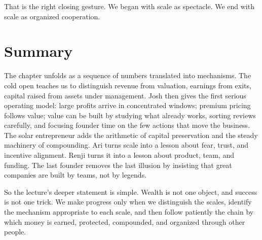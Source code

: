 That is the right closing gesture. We began with scale as spectacle. We end with scale as organized cooperation.

\section{Summary}

The chapter unfolds as a sequence of numbers translated into mechanisms. The cold open teaches us to distinguish revenue from valuation, earnings from exits, capital raised from assets under management. Josh then gives the first serious operating model: large profits arrive in concentrated windows; premium pricing follows value; value can be built by studying what already works, sorting reviews carefully, and focusing founder time on the few actions that move the business. The solar entrepreneur adds the arithmetic of capital preservation and the steady machinery of compounding. Ari turns scale into a lesson about fear, trust, and incentive alignment. Renji turns it into a lesson about product, team, and funding. The last founder removes the last illusion by insisting that great companies are built by teams, not by legends.

So the lecture's deeper statement is simple. Wealth is not one object, and success is not one trick. We make progress only when we distinguish the scales, identify the mechanism appropriate to each scale, and then follow patiently the chain by which money is earned, protected, compounded, and organized through other people.